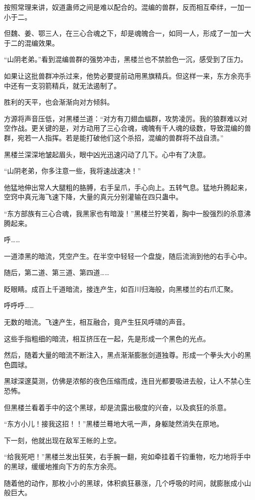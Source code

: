 \begin{this_body}
按照常理来讲，奴道蛊师之间是难以配合的。混编的兽群，反而相互牵绊，一加一小于二。

但魏、姜、鄂三人，在三心合魂之下，却是魂魄合一，如同一人，形成了一加一大于二的混编效果。

“山阴老弟。”看到混编兽群的强势冲击，黑楼兰也不禁脸色一沉，感受到了压力。

如果让这批兽群冲杀过来，他势必要提前动用黑旗精兵。但这样一来，东方余亮手中还有一支羽箭精兵，就无法遏制了。

胜利的天平，也会渐渐向对方倾斜。

方源将声音压低，对黑楼兰道：“对方有刀翅血蝠群，攻势凌厉。我的狼群难以对空作战。更关键的是，对方动用了三心合魂，魂魄有千人魂的级数，导致混编的兽群，宛若一人指挥。若是能打破他们这个杀招，混编的兽群将不战自溃。”

黑楼兰深深地皱起眉头，眼中凶光迅速闪动了几下。心中有了决意。

“山阴老弟，你多注意一些，我将速战速决！”

他猛地伸出常人大腿粗的胳膊，右手呈爪，手心向上。五转气息。猛地升腾起来，空窍中真元海飞速下降，大量的真元分别灌输在四只蛊中。

“东方部族有三心合魂，我黑家也有暗漩！”黑楼兰狞笑着，胸中一股强烈的杀意沸腾起来。

呼……

一道漆黑的暗流，凭空产生。在半空中轻轻一个盘旋，随后流淌到他的右手心中。

随后，第二道、第三道、第四道……

眨眼睛。成百上千道暗流，接连产生，如百川归海般，向黑楼兰的右爪汇聚。

呼呼呼……

无数的暗流。飞速产生，相互融合，竟产生狂风呼啸的声音。

这些手指粗细的暗流，相互挤压在一起，先是形成一个黑色的光点。

然后，随着大量的暗流不断注入，黑点渐渐膨胀剑道独尊。形成一个拳头大小的黑色圆球。

黑球深邃莫测，仿佛是浓郁的夜色压缩而成，连目光都要吸进去般，让人不禁心生恐怖。

但黑楼兰看着手中的这个黑球，却是流露出极度的兴奋，以及疯狂的杀意。

“东方小儿！接我这招！！”黑楼兰蓦地大吼一声，身躯陡然消失在原地。

下一刻，他就出现在敌军王帐的上空。

“给我死吧！”黑楼兰发出狂笑，右手腕一翻，宛如牵挂着千钧重物，吃力地将手中的黑球，缓缓地推向下方的东方余亮。

随着他的动作，那枚小小的黑球，体积疯狂暴涨，几个呼吸的时间，就膨胀成小山般巨大。


\end{this_body}
